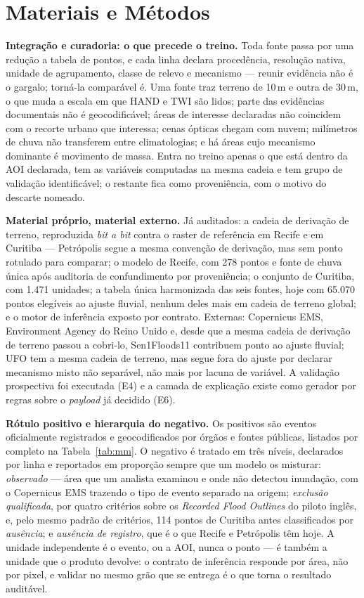 \documentclass[conference]{IEEEtran}
\begin{document}
\section{Materiais e Métodos}

\textbf{Integração e curadoria: o que precede o treino.} Toda fonte passa por
uma redução a tabela de pontos, e cada linha declara procedência, resolução
nativa, unidade de agrupamento, classe de relevo e mecanismo --- reunir
evidência não é o gargalo; torná-la comparável é. Uma fonte traz terreno de
10\,m e outra de 30\,m, o que muda a escala em que HAND e TWI são lidos; parte
das evidências documentais não é geocodificável; áreas de interesse declaradas
não coincidem com o recorte urbano que interessa; cenas ópticas chegam com
nuvem; milímetros de chuva não transferem entre climatologias; e há áreas cujo
mecanismo dominante é movimento de massa. Entra no treino apenas o que está
dentro da AOI declarada, tem as variáveis computadas na mesma cadeia e tem
grupo de validação identificável; o restante fica como proveniência, com o
motivo do descarte nomeado.

\textbf{Material próprio, material externo.} Já auditados: a cadeia de derivação
de terreno, reproduzida \emph{bit a bit} contra o raster de referência em Recife
e em Curitiba --- Petrópolis segue a mesma convenção de derivação, mas sem ponto
rotulado para comparar; o modelo de Recife, com 278 pontos e fonte de chuva
única após auditoria de confundimento por proveniência; o conjunto de
Curitiba, com 1.471 unidades; a tabela única harmonizada das seis fontes, hoje
com 65.070 pontos elegíveis ao ajuste fluvial, nenhum deles mais em cadeia de
terreno global; e o motor de inferência exposto por contrato. Externas:
Copernicus EMS, Environment Agency do Reino Unido e, desde que a mesma cadeia
de derivação de terreno passou a cobri-lo, Sen1Floods11 contribuem ponto ao
ajuste fluvial; UFO tem a mesma cadeia de terreno, mas segue fora do ajuste
por declarar mecanismo misto não separável, não mais por lacuna de variável.
A validação prospectiva foi executada (E4) e a camada de explicação existe como
gerador por regras sobre o \emph{payload} já decidido (E6).

\textbf{Rótulo positivo e hierarquia do negativo.} Os positivos são eventos
oficialmente registrados e geocodificados por órgãos e fontes públicas,
listados por completo na Tabela~\ref{tab:mm}. O
negativo é tratado em três níveis, declarados por linha e reportados em proporção
sempre que um modelo os misturar: \emph{observado} --- área que um analista
examinou e onde não detectou inundação, com o Copernicus EMS trazendo o tipo de
evento separado na origem; \emph{exclusão qualificada}, por quatro critérios
sobre os \emph{Recorded Flood Outlines} do piloto inglês, e, pelo mesmo
padrão de critérios, 114 pontos de Curitiba antes classificados por
\emph{ausência}; e \emph{ausência de registro}, que é o que Recife e
Petrópolis têm hoje. A unidade
independente é o evento, ou a AOI, nunca o ponto --- é também a unidade que o
produto devolve: o contrato de inferência responde por área, não por pixel, e
validar no mesmo grão que se entrega é o que torna o resultado auditável.
\end{document}
